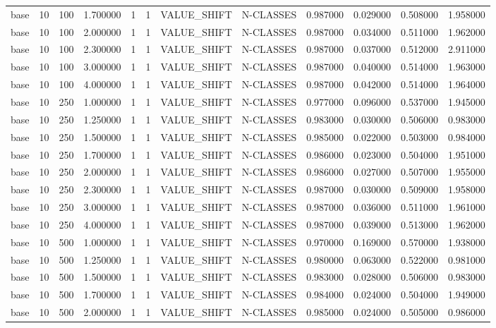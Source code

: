 \begin{tabular}{lrrrllllrrrr}
base & 10 & 100 & 1.700000 & 1 & 1 & VALUE_SHIFT & N-CLASSES & 0.987000 & 0.029000 & 0.508000 & 1.958000 \\
base & 10 & 100 & 2.000000 & 1 & 1 & VALUE_SHIFT & N-CLASSES & 0.987000 & 0.034000 & 0.511000 & 1.962000 \\
base & 10 & 100 & 2.300000 & 1 & 1 & VALUE_SHIFT & N-CLASSES & 0.987000 & 0.037000 & 0.512000 & 2.911000 \\
base & 10 & 100 & 3.000000 & 1 & 1 & VALUE_SHIFT & N-CLASSES & 0.987000 & 0.040000 & 0.514000 & 1.963000 \\
base & 10 & 100 & 4.000000 & 1 & 1 & VALUE_SHIFT & N-CLASSES & 0.987000 & 0.042000 & 0.514000 & 1.964000 \\
base & 10 & 250 & 1.000000 & 1 & 1 & VALUE_SHIFT & N-CLASSES & 0.977000 & 0.096000 & 0.537000 & 1.945000 \\
base & 10 & 250 & 1.250000 & 1 & 1 & VALUE_SHIFT & N-CLASSES & 0.983000 & 0.030000 & 0.506000 & 0.983000 \\
base & 10 & 250 & 1.500000 & 1 & 1 & VALUE_SHIFT & N-CLASSES & 0.985000 & 0.022000 & 0.503000 & 0.984000 \\
base & 10 & 250 & 1.700000 & 1 & 1 & VALUE_SHIFT & N-CLASSES & 0.986000 & 0.023000 & 0.504000 & 1.951000 \\
base & 10 & 250 & 2.000000 & 1 & 1 & VALUE_SHIFT & N-CLASSES & 0.986000 & 0.027000 & 0.507000 & 1.955000 \\
base & 10 & 250 & 2.300000 & 1 & 1 & VALUE_SHIFT & N-CLASSES & 0.987000 & 0.030000 & 0.509000 & 1.958000 \\
base & 10 & 250 & 3.000000 & 1 & 1 & VALUE_SHIFT & N-CLASSES & 0.987000 & 0.036000 & 0.511000 & 1.961000 \\
base & 10 & 250 & 4.000000 & 1 & 1 & VALUE_SHIFT & N-CLASSES & 0.987000 & 0.039000 & 0.513000 & 1.962000 \\
base & 10 & 500 & 1.000000 & 1 & 1 & VALUE_SHIFT & N-CLASSES & 0.970000 & 0.169000 & 0.570000 & 1.938000 \\
base & 10 & 500 & 1.250000 & 1 & 1 & VALUE_SHIFT & N-CLASSES & 0.980000 & 0.063000 & 0.522000 & 0.981000 \\
base & 10 & 500 & 1.500000 & 1 & 1 & VALUE_SHIFT & N-CLASSES & 0.983000 & 0.028000 & 0.506000 & 0.983000 \\
base & 10 & 500 & 1.700000 & 1 & 1 & VALUE_SHIFT & N-CLASSES & 0.984000 & 0.024000 & 0.504000 & 1.949000 \\
base & 10 & 500 & 2.000000 & 1 & 1 & VALUE_SHIFT & N-CLASSES & 0.985000 & 0.024000 & 0.505000 & 0.986000 \\

\end{tabular}
